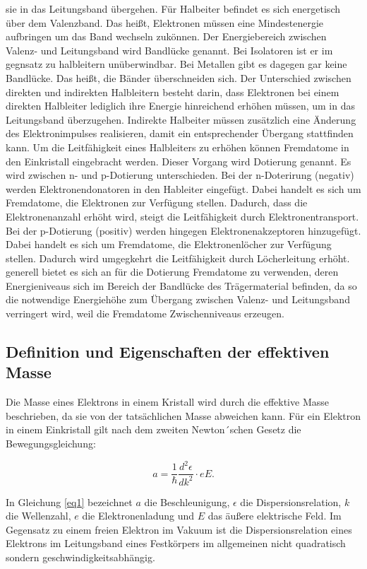sie in das Leitungsband übergehen. Für Halbeiter befindet es sich energetisch über 
dem Valenzband. Das heißt, Elektronen müssen eine Mindestenergie aufbringen um das 
Band wechseln zukönnen. Der Energiebereich zwischen Valenz- und Leitungsband 
wird Bandlücke genannt. Bei Isolatoren ist er im gegnsatz zu halbleitern unüberwindbar.
Bei Metallen gibt es dagegen gar keine 
Bandlücke. Das heißt, die Bänder überschneiden sich. 
Der Unterschied zwischen direkten und indirekten Halbleitern besteht darin, dass Elektronen 
bei einem direkten Halbleiter lediglich ihre Energie hinreichend erhöhen müssen, um in 
das Leitungsband überzugehen. Indirekte Halbeiter müssen zusätzlich eine Änderung 
des Elektronimpulses realisieren, damit ein entsprechender Übergang stattfinden kann.
Um die Leitfähigkeit eines Halbleiters zu erhöhen können Fremdatome in den Einkristall 
eingebracht werden. Dieser Vorgang wird Dotierung genannt.
Es wird zwischen n- und p-Dotierung unterschieden. Bei der n-Doterirung (negativ) werden 
Elektronendonatoren in den Hableiter eingefügt. Dabei handelt es sich um Fremdatome, die
Elektronen zur Verfügung stellen. Dadurch, dass die Elektronenanzahl erhöht wird, 
steigt die Leitfähigkeit durch Elektronentransport.
Bei der p-Dotierung (positiv) werden hingegen Elektronenakzeptoren hinzugefügt. 
Dabei handelt es sich um Fremdatome, die Elektronenlöcher zur Verfügung stellen. 
Dadurch wird umgegkehrt die Leitfähigkeit durch Löcherleitung erhöht. 
generell bietet es sich an für die Dotierung Fremdatome zu verwenden, deren 
Energieniveaus sich im Bereich der Bandlücke des Trägermaterial befinden, da so die 
notwendige Energiehöhe zum Übergang zwischen Valenz- und Leitungsband verringert wird, 
weil die Fremdatome Zwischenniveaus erzeugen.

\subsection{Definition und Eigenschaften der effektiven Masse}
Die Masse eines Elektrons in einem Kristall wird durch die effektive Masse beschrieben, 
da sie von der tatsächlichen Masse abweichen kann. 
Für ein Elektron in einem Einkristall gilt nach dem zweiten Newton´schen Gesetz die 
Bewegungsgleichung:

\begin{equation}
    a = \frac{1}{\hbar} \frac{d^2\epsilon}{dk^2}\cdot eE.
    \label{eq1}
\end{equation}

In Gleichung \ref{eq1} bezeichnet $a$ die Beschleunigung, $\epsilon$ die 
Dispersionsrelation, $k$ die Wellenzahl, $e$ die Elektronenladung und $E$ das
äußere elektrische Feld.
Im Gegensatz zu einem freien Elektron im Vakuum ist die Dispersionsrelation eines 
Elektrons im Leitungsband eines Festkörpers im allgemeinen nicht quadratisch
sondern geschwindigkeitsabhängig. 

